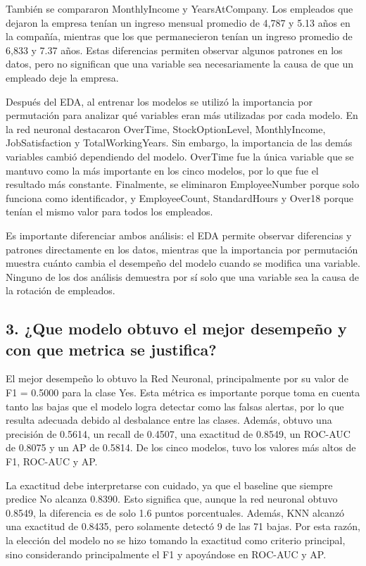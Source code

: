 \documentclass[letterpaper,11pt]{article}
\begin{document}
También se compararon MonthlyIncome y YearsAtCompany. Los empleados que dejaron la empresa tenían un ingreso mensual promedio de 4,787 y 5.13 años en la compañía, mientras que los que permanecieron tenían un ingreso promedio de 6,833 y 7.37 años. Estas diferencias permiten observar algunos patrones en los datos, pero no significan que una variable sea necesariamente la causa de que un empleado deje la empresa.

Después del EDA, al entrenar los modelos se utilizó la importancia por permutación para analizar qué variables eran más utilizadas por cada modelo. En la red neuronal destacaron OverTime, StockOptionLevel, MonthlyIncome, JobSatisfaction y TotalWorkingYears. Sin embargo, la importancia de las demás variables cambió dependiendo del modelo. OverTime fue la única variable que se mantuvo como la más importante en los cinco modelos, por lo que fue el resultado más constante. Finalmente, se eliminaron EmployeeNumber porque solo funciona como identificador, y EmployeeCount, StandardHours y Over18 porque tenían el mismo valor para todos los empleados.

Es importante diferenciar ambos análisis: el EDA permite observar diferencias y patrones directamente en los datos, mientras que la importancia por permutación muestra cuánto cambia el desempeño del modelo cuando se modifica una variable. Ninguno de los dos análisis demuestra por sí solo que una variable sea la causa de la rotación de empleados.

\subsection*{3. ¿Que modelo obtuvo el mejor desempeño y con que metrica se justifica?}

El mejor desempeño lo obtuvo la Red Neuronal, principalmente por su valor de F1 = 0.5000 para la clase Yes. Esta métrica es importante porque toma en cuenta tanto las bajas que el modelo logra detectar como las falsas alertas, por lo que resulta adecuada debido al desbalance entre las clases. Además, obtuvo una precisión de 0.5614, un recall de 0.4507, una exactitud de 0.8549, un ROC-AUC de 0.8075 y un AP de 0.5814. De los cinco modelos, tuvo los valores más altos de F1, ROC-AUC y AP.

La exactitud debe interpretarse con cuidado, ya que el baseline que siempre predice No alcanza 0.8390. Esto significa que, aunque la red neuronal obtuvo 0.8549, la diferencia es de solo 1.6 puntos porcentuales. Además, KNN alcanzó una exactitud de 0.8435, pero solamente detectó 9 de las 71 bajas. Por esta razón, la elección del modelo no se hizo tomando la exactitud como criterio principal, sino considerando principalmente el F1 y apoyándose en ROC-AUC y AP.
\end{document}
